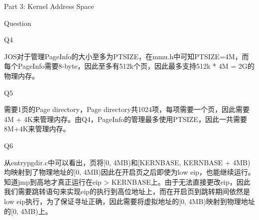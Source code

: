 \documentclass[GBK,winfonts,a4paper,10pt]{ctexart}
\begin{document}
\begin{section}{Part 3: Kernel Address Space}
\begin{subsection}{Question}
\begin{subsubsection}{Q4}
\par
JOS对于管理PageInfo的大小至多为PTSIZE，在mmu.h中可知PTSIZE=4M，而每个PageInfo需要8-byte，因此至多有512k个页，因此最多支持512k * 4M = 2G的物理内存。
\end{subsubsection}

\begin{subsubsection}{Q5}
\par
需要1页的Page directory，Page directory共1024项，每项需要一个页，因此需要4M + 4K来管理内存。由Q4，PageInfo的管理最多使用PTSIZE，因此一共需要8M+4K来管理内存。
\end{subsubsection}

\begin{subsubsection}{Q6}
\par
从entrypgdir.c中可以看出，页将[0, 4MB)和[KERNBASE, KERNBASE + 4MB)均映射到了物理地址的[0, 4MB)因此在开启页之后即使为low eip，也能继续运行。知道jmp到高地才真正运行在eip > KERNBASE上。由于无法直接更改eip，因此我们需要跳转语句来实现eip的执行到高位地址上，而在开启页到跳转期间依然是low eip执行，为了保证寻址正确，因此需要将虚拟地址的[0, 4MB)映射到物理地址的[0, 4MB)上。
\end{subsubsection}


\end{subsection}


\end{section}
\end{document}
